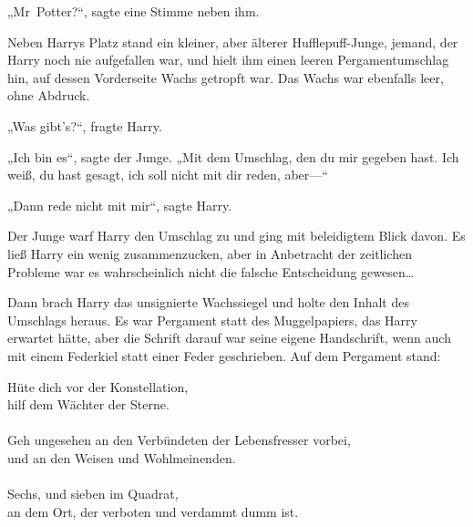 „Mr~Potter?“, sagte eine Stimme neben ihm.

Neben Harrys Platz stand ein kleiner, aber älterer Hufflepuff-Junge, jemand, der Harry noch nie aufgefallen war, und hielt ihm einen leeren Pergamentumschlag hin, auf dessen Vorderseite Wachs getropft war. Das Wachs war ebenfalls leer, ohne Abdruck.

„Was gibt’s?“, fragte Harry.

„Ich bin es“, sagte der Junge. „Mit dem Umschlag, den du mir gegeben hast. Ich weiß, du hast gesagt, ich soll nicht mit dir reden, aber—“

„Dann rede nicht mit mir“, sagte Harry.

Der Junge warf Harry den Umschlag zu und ging mit beleidigtem Blick davon. Es ließ Harry ein wenig zusammenzucken, aber in Anbetracht der zeitlichen Probleme war es wahrscheinlich nicht die falsche Entscheidung gewesen…

Dann brach Harry das unsignierte Wachssiegel und holte den Inhalt des Umschlags heraus. Es war Pergament statt des Muggelpapiers, das Harry erwartet hätte, aber die Schrift darauf war seine eigene Handschrift, wenn auch mit einem Federkiel statt einer Feder geschrieben. Auf dem Pergament stand:

\begin{writtenNote}
Hüte dich vor der Konstellation,\\
hilf dem Wächter der Sterne.\\
\\
Geh ungesehen an den Verbündeten der Lebensfresser vorbei,\\
und an den Weisen und Wohlmeinenden.\\
\\
Sechs, und sieben im Quadrat,\\
an dem Ort, der verboten und verdammt dumm ist.
\end{writtenNote}

